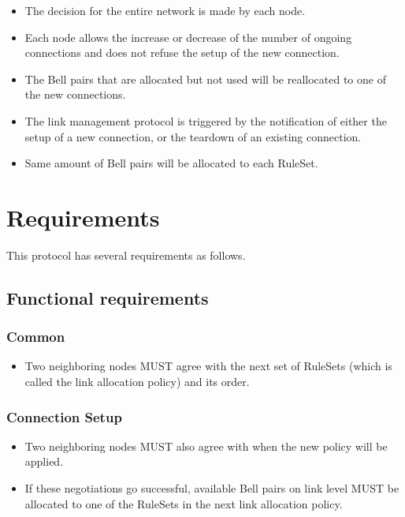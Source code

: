 \begin{itemize}
  \item The decision for the entire network is made by each node.
  \item Each node allows the increase or decrease of the number of ongoing connections and does not refuse the setup of the new connection.
  \item The Bell pairs that are allocated but not used will be reallocated to one of the new connections.
  \item The link management protocol is triggered by the notification of either the setup of a new connection, or the teardown of an existing connection.
  \item Same amount of Bell pairs will be allocated to each RuleSet.
\end{itemize}

\section{Requirements}

This protocol has several requirements as follows.

\subsection{Functional requirements}

\subsubsection{Common}

\begin{itemize}
  \item Two neighboring nodes MUST agree with the next set of RuleSets (which is called the link allocation policy) and its order.
\end{itemize}

\subsubsection{Connection Setup}

\begin{itemize}
  \item Two neighboring nodes MUST also agree with when the new policy will be applied.
  \item If these negotiations go successful, available Bell pairs on link level MUST be allocated to one of the RuleSets in the next link allocation policy.
\end{itemize}

